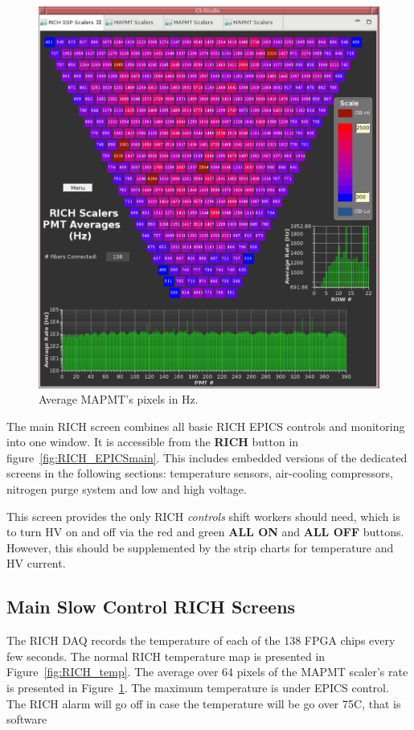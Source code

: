 \documentclass[12pt]{article}
\begin{document}
\begin{figure}
     \centering
     \includegraphics[width=1.3\linewidth]{pics/RICH_scalers.png}
     \caption{Average MAPMT's pixels in Hz.}
     \label{fig:RICH_scalers}
\end{figure}


 \onecolumn


The main RICH screen combines all basic RICH EPICS controls and monitoring into one window.  It is accessible from the {\bf RICH} 
button in figure~\ref{fig:RICH_EPICSmain}.  This includes embedded versions of the dedicated screens in the following sections:  temperature 
sensors, air-cooling compressors, nitrogen purge system and low and high voltage.  
 
This screen provides the only RICH {\em controls} shift workers should need, which is to turn HV on and off via the red and green 
{\bf ALL ON} and {\bf ALL OFF} buttons.  However, this should be supplemented by the strip charts for temperature and HV current.

\subsection{Main Slow Control RICH Screens}
The RICH DAQ records the temperature of each of the 138 FPGA chips every few seconds. The normal RICH temperature map
is presented in Figure~\ref{fig:RICH_temp}. 
The average over 64 pixels of the MAPMT scaler's rate is presented in Figure~\ref{fig:RICH_scalers}. The maximum temperature is under EPICS control. The RICH alarm will go off in case the temperature will be go over 75C, that is software 
\end{document}

